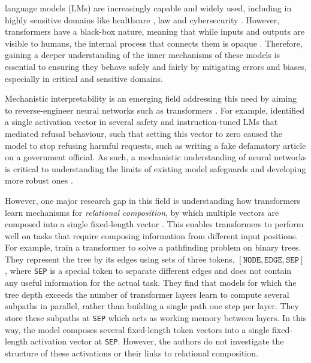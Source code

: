 
 language models (LMs) are increasingly capable \cite{radford2019language, brown2020language, hoffmann2022empirical, chowdhery2023palm, kwa2025measuring} and widely used, including in highly sensitive domains like healthcare \cite{maity2025large}, law \cite{dehghani2025large} and cybersecurity \cite{ferrag2025generative}.
However, transformers have a black-box nature, meaning that while inputs and outputs are visible to humans, the internal process that connects them is opaque \cite{lipton2018mythos}.
Therefore, gaining a deeper understanding of the inner mechanisms of these models is essential to ensuring they behave safely and fairly by mitigating errors and biases, especially in critical and sensitive domains.

Mechanistic interpretability is an emerging field addressing this need by aiming to reverse-engineer neural networks such as transformers \cite{olah2020zoom,ferrando2024primer}.
For example, \citet{arditi2024refusal} identified a single activation vector in several safety and instruction-tuned LMs that mediated refusal behaviour, such that setting this vector to zero caused the model to stop refusing harmful requests, such as writing a fake defamatory article on a government official.
As such, a mechanistic understanding of neural networks is critical to understanding the limits of existing model safeguards and developing more robust ones \cite{yu2025robust}.

However, one major research gap in this field is understanding how transformers learn mechanisms for \emph{relational composition}, by which multiple vectors are composed into a single fixed-length vector \cite{wattenberg2024relational}. This enables transformers to perform well on tasks that require composing information from different input positions.
For example, \citet{brinkmann2024mechanistic} train a transformer to solve a pathfinding problem on binary trees. They represent the tree by its edges using sets of three tokens, $[\texttt{NODE}, \texttt{EDGE}, \texttt{SEP}]$, where \texttt{SEP} is a special token to separate different edges and does not contain any useful information for the actual task.
They find that models for which the tree depth exceeds the number of transformer layers learn to compute several subpaths in parallel, rather than building a single path one step per layer. They store these subpaths at \texttt{SEP} which acts as working memory between layers. In this way, the model composes several fixed-length token vectors into a single fixed-length activation vector at \texttt{SEP}. However, the authors do not investigate the structure of these activations or their links to relational composition.

